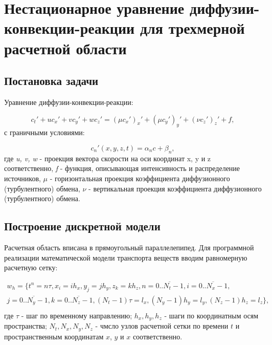 \documentclass[12pt]{article}
\begin{document}
\section{Нестационарное уравнение диффузии-конвекции-реакции для трехмерной расчетной области}

\subsection{Постановка задачи}

Уравнение диффузии-конвекции-реакции:


\begin{equation}
	c_t' + uc_x' + vc_y' + wc_z' = (\mu c_x')_x' + (\mu c_y')_y' + (\nu c_z')_z' + f,	
\end{equation}
с граничными условиями:

\begin{equation}
	c_n'(x, y, z, t) = \alpha_n c + \beta_n,
\end{equation}
где
\textit{u, v, w} - проекция вектора скорости на оси координат x, y и z соответственно,
\textit{f} - функция, описывающая интенсивность и распределение источников,
${\mu}$ - горизонтальная проекция коэффициента диффузионного (турбулентного) обмена,
${\nu}$ - вертикальная проекция коэффициента диффузионного (турбулентного) обмена.

\subsection{Построение дискретной модели}

Расчетная область вписана в прямоугольный параллелепипед. Для программной реализации математической модели транспорта веществ вводим равномерную расчетную сетку:

\begin{displaymath}
	\begin{split}
	w_h = \{t^n = n \tau, x_i = ih_x, y_j = jh_y, z_k = kh_z, n = \overline{0..N_t-1}, i = \overline{0..N_x-1},  \nonumber\\
	j = \overline{0..N_y-1}, k = \overline{0..N_z-1}, (N_t-1) \tau = l_x, (N_y-1)h_y = l_y, (N_z-1)h_z = l_z \}, \nonumber\\
	\end{split}
\end{displaymath}
где
${\tau}$ - шаг по временному направлению;
${h_x, h_y, h_z}$ - шаги по координатным осям пространства;
${N_t, N_x, N_y, N_z}$ - чмсло узлов расчетной сетки  по времени $t$ и пространственным координатам $x$, $y$ и $x$ соответственно.
\end{document}

